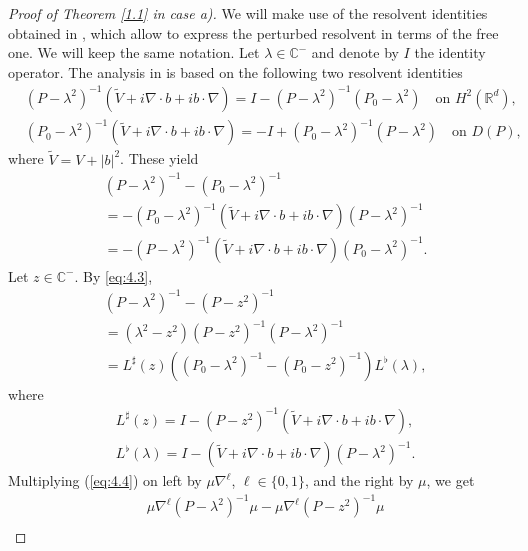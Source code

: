 \documentclass[11pt]{amsart}
\numberwithin{equation}{section}
\def\R{{\mathbb R}}
\begin{document}
 \begin{proof}[Proof of Theorem \ref{1.1} in case a)]
 We will make use of the resolvent identities obtained in \cite[Section 3]{kn:LSV}, which allow to express the perturbed resolvent in terms
 of the free one. We will keep the same notation. Let $\lambda\in\mathbb{C}^-$ and denote by $I$ the identity operator. 
 The analysis in \cite{kn:LSV} is based on the following two resolvent identities
\begin{align*}
& (P- \lambda^2)^{-1} (\widetilde{V} +  i\nabla\cdot b+ib\cdot\nabla) =  
I - (P- \lambda^2)^{-1} (P_0 - \lambda^2) \quad \text{on }H^2(\R^d), \\
& (P_0- \lambda^2)^{-1} (\widetilde{V} +  i\nabla\cdot b+ib\cdot\nabla) =  
-I + (P_0- \lambda^2)^{-1} (P - \lambda^2) \quad \text{on } D(P), 
\end{align*}
 where $\widetilde V = V + |b|^2$. These yield
\begin{equation}\label{eq:4.3}
\begin{split}
&(P-\lambda^2)^{-1}-(P_0-\lambda^2)^{-1}\\
&=-(P_0-\lambda^2)^{-1}(\widetilde V+i\nabla\cdot b+ib\cdot\nabla)(P-\lambda^2)^{-1}\\
&=-(P-\lambda^2)^{-1}(\widetilde V+i\nabla\cdot b+ib\cdot\nabla)(P_0-\lambda^2)^{-1}.
\end{split}
\end{equation}
Let $z\in\mathbb{C}^-$. By \eqref{eq:4.3},
\begin{equation}\label{eq:4.4}
\begin{split}
&(P-\lambda^2)^{-1}-(P-z^2)^{-1}\\
&=(\lambda^2-z^2)(P-z^2)^{-1}(P-\lambda^2)^{-1}\\
&=L^\sharp(z)((P_0-\lambda^2)^{-1}-(P_0-z^2)^{-1})L^\flat(\lambda),
\end{split}
\end{equation}
where
\begin{align*}
& L^\sharp(z)=I-(P-z^2)^{-1}(\widetilde V+i\nabla\cdot b+ib\cdot\nabla),\\
 & L^\flat(\lambda) =I-(\widetilde V+i\nabla\cdot b+ib\cdot\nabla)(P-\lambda^2)^{-1}.
 \end{align*}
Multiplying (\ref{eq:4.4}) on left by $\mu \nabla^{\ell}$, $\ell \in \{0, 1\}$, and the right by $\mu$, we get
\begin{equation}\label{eq:4.5}
\begin{split}
&\mu \nabla^{\ell} (P-\lambda^2)^{-1}\mu-\mu \nabla^{\ell}(P-z^2)^{-1}\mu\\

\end{split}
\end{equation}
\end{proof}
\end{document}
